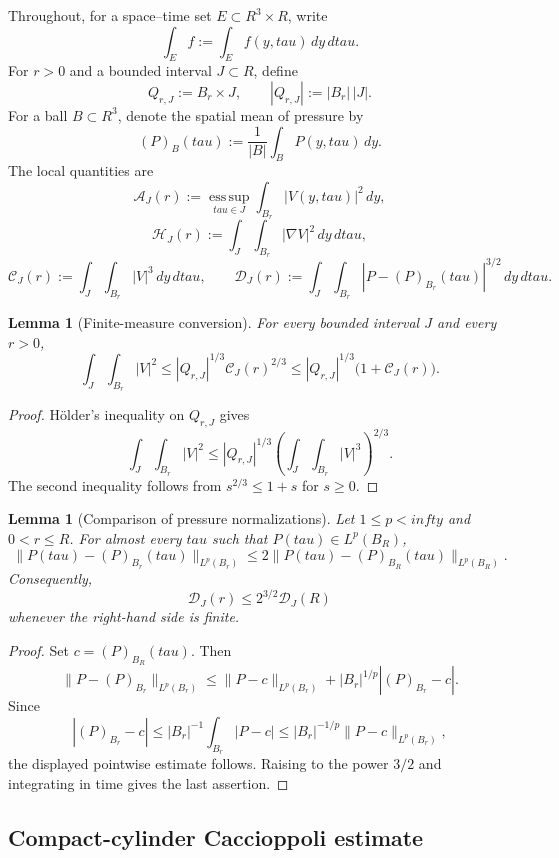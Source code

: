 \documentclass[11pt]{amsart}
\def\mathbb#1{#1}%
\def\tau{tau}%
\def\infty{infty}%
\theoremstyle{plain}
\newtheorem{lemma}[theorem]{Lemma}
\theoremstyle{definition}
\theoremstyle{remark}
\begin{document}
Throughout, for a space--time set $E\subset\mathbb R^3\times\mathbb R$, write
\[
\int_E f:=\int_E f(y,\tau)\,dy\,d\tau.
\]
For $r>0$ and a bounded interval $J\subset\mathbb R$, define
\[
Q_{r,J}:=B_r\times J,\qquad |Q_{r,J}|:=|B_r|\,|J|.
\]
For a ball $B\subset\mathbb R^3$, denote the spatial mean of pressure by
\[
(P)_B(\tau):=\frac1{|B|}\int_B P(y,\tau)\,dy.
\]
The local quantities are
\[
\mathcal A_J(r):=\operatorname*{ess\,sup}_{\tau\in J}\int_{B_r}|V(y,\tau)|^2\,dy,
\]
\[
\mathcal H_J(r):=\int_J\!\int_{B_r}|\nabla V|^2\,dy\,d\tau,
\]
\[
\mathcal C_J(r):=\int_J\!\int_{B_r}|V|^3\,dy\,d\tau,
\qquad
\mathcal D_J(r):=\int_J\!\int_{B_r}|P-(P)_{B_r}(\tau)|^{3/2}\,dy\,d\tau.
\]

\begin{lemma}[Finite-measure conversion]\label{paper4:lem:l2-from-l3}
For every bounded interval $J$ and every $r>0$,
\[
\int_J\!\int_{B_r}|V|^2
\le |Q_{r,J}|^{1/3}\mathcal C_J(r)^{2/3}
\le |Q_{r,J}|^{1/3}\bigl(1+\mathcal C_J(r)\bigr).
\]
\end{lemma}

\begin{proof}
H\"older's inequality on $Q_{r,J}$ gives
\[
\int_J\!\int_{B_r}|V|^2
\le |Q_{r,J}|^{1/3}\left(\int_J\!\int_{B_r}|V|^3\right)^{2/3}.
\]
The second inequality follows from $s^{2/3}\le 1+s$ for $s\ge0$.
\end{proof}

\begin{lemma}[Comparison of pressure normalizations]\label{paper4:lem:pressure-means}
Let $1\le p<\infty$ and $0<r\le R$. For almost every $\tau$ such that
$P(\tau)\in L^p(B_R)$,
\[
\|P(\tau)-(P)_{B_r}(\tau)\|_{L^p(B_r)}
\le 2\|P(\tau)-(P)_{B_R}(\tau)\|_{L^p(B_R)}.
\]
Consequently,
\[
\mathcal D_J(r)\le 2^{3/2}\mathcal D_J(R)
\]
whenever the right-hand side is finite.
\end{lemma}

\begin{proof}
Set $c=(P)_{B_R}(\tau)$. Then
\[
\|P-(P)_{B_r}\|_{L^p(B_r)}
\le \|P-c\|_{L^p(B_r)}+|B_r|^{1/p}|(P)_{B_r}-c|.
\]
Since
\[
|(P)_{B_r}-c|\le |B_r|^{-1}\int_{B_r}|P-c|
\le |B_r|^{-1/p}\|P-c\|_{L^p(B_r)},
\]
the displayed pointwise estimate follows. Raising to the power $3/2$ and
integrating in time gives the last assertion.
\end{proof}

\subsection{Compact-cylinder Caccioppoli estimate}
\end{document}
